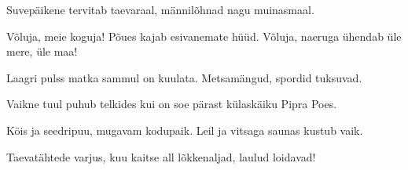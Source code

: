 Suvep\"aikene tervitab taevaraal,
m\"annil\~ohnad nagu muinasmaal.

V\~oluja, meie koguja!
P\~oues kajab esivanemate h\"u\"ud.
V\~oluja, naeruga \"uhendab
\"ule mere, \"ule maa!

Laagri pulss matka sammul on kuulata.
Metsam\"angud, spordid tuksuvad.

Vaikne tuul puhub telkides kui on soe
p\"arast k\"ulask\"aiku Pipra Poes.

K\"ois ja seedripuu, mugavam kodupaik.
Leil ja vitsaga saunas kustub vaik.

Taevat\"ahtede varjus, kuu kaitse all
l\~okkenaljad, laulud loidavad!
